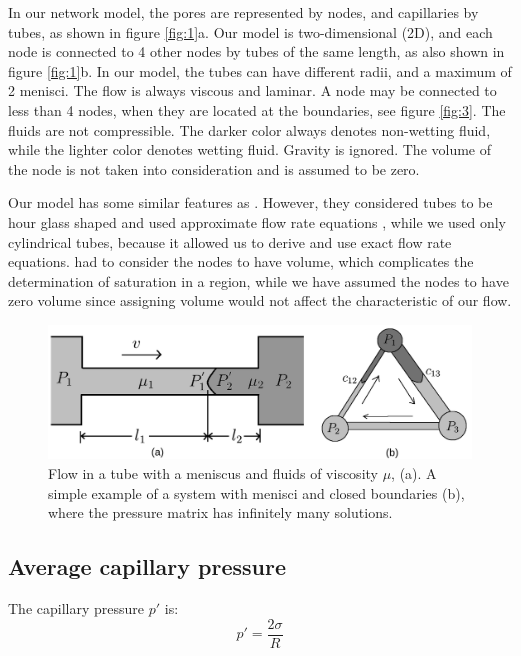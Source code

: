 \documentclass[
	12pt
] {article}
\begin{document}
	In our network model, the pores are represented by nodes, and capillaries by tubes, as shown in figure \ref{fig:1}a. Our model is two-dimensional (2D), and each node is connected to 4 other nodes by tubes of the same length, as also shown in figure \ref{fig:1}b. In our model, the tubes can have different radii, and a maximum of 2 menisci. The flow is always viscous and laminar. A node may be connected to less than 4 nodes, when they are located at the boundaries, see figure \ref{fig:3}. The fluids are not compressible. The darker color always denotes non-wetting fluid, while the lighter color denotes wetting fluid. Gravity is ignored. The volume of the node is not taken into consideration and is assumed to be zero.
	
	Our model has some similar features as \cite{aker1998two}. However, they considered tubes to be hour glass shaped and used approximate flow rate equations \cite{washburn1921dynamics}, while we used only cylindrical tubes, because it allowed us to derive and use exact flow rate equations. \cite{aker1998two} had to consider the nodes to have volume, which complicates the determination of saturation in a region, while we have assumed the nodes to have zero volume since assigning volume would not affect the characteristic of our flow.
	
	\begin{figure}
		\centering
		\includegraphics[width=\textwidth]{fig_2_2200x700}
		\caption{Flow in a tube with a meniscus and fluids of viscosity $\mu$,  (a). A simple example of a system with menisci and closed boundaries (b), where the pressure matrix has infinitely many solutions.}
		\label{fig:2}
	\end{figure}
	
\subsection{Average capillary pressure}
	The capillary pressure $p'$ is:
	\begin{equation} \label{eq:surface-tension}
		p' = \frac{2 \sigma}{R}
	\end{equation}
	
\end{document}
